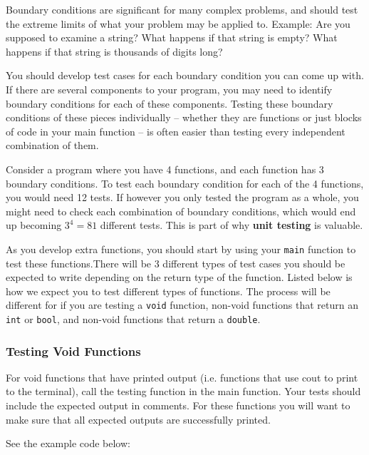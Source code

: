 Boundary conditions are significant for many complex problems, and should test the extreme limits of what your problem may be applied to. Example: Are you supposed to examine a string? What happens if that string is empty? What happens if that string is thousands of digits long? 

You should develop test cases for each boundary condition you can come up with. If there are several components to your program, you may need to identify boundary conditions for each of these components. Testing these boundary conditions of these pieces individually -- whether they are functions or just blocks of code in your main function -- is often easier than testing every independent combination of them. 

Consider a program where you have 4 functions, and each function has 3 boundary conditions. To test each boundary condition for each of the 4 functions, you would need 12 tests. If however you only tested the program as a whole, you might need to check each combination of boundary conditions, which would end up becoming $3^4 = 81$ different tests. This is part of why \textbf{unit testing} is valuable. 

As you develop extra functions, you should start by using your \texttt{main} function to test these functions.There will be 3 different types of test cases you should be expected to write depending on the return type of the function. Listed below is how we expect you to test different types of functions. The process will be different for if you are testing a \texttt{void} function, non-void functions that return an \texttt{int} or \texttt{bool}, and non-void functions that return a \texttt{double}.

\subsubsection{Testing Void Functions}

For void functions that have printed output (i.e. functions that use cout to print to the terminal), call the testing function in the main function. Your tests should include the expected output in comments. For these functions you will want to make sure that all expected outputs are successfully printed.

See the example code below:

